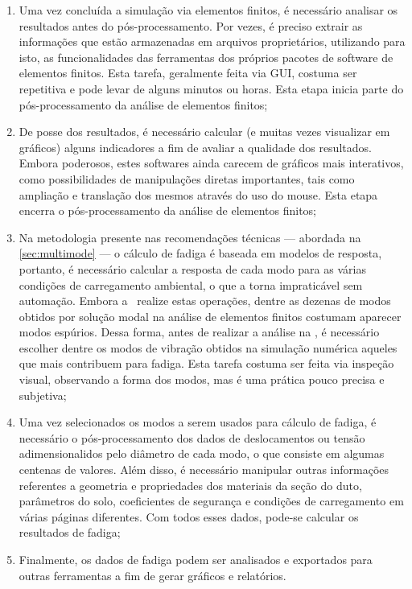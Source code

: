 \begin{enumerate}[label= (\arabic*)]
    \item Uma vez concluída a simulação via elementos finitos, é necessário analisar os resultados antes do pós-processamento. Por vezes, é preciso extrair as informações que estão armazenadas em arquivos proprietários, utilizando para isto, as funcionalidades das ferramentas dos próprios pacotes de software de elementos finitos. Esta tarefa, geralmente feita via GUI, costuma ser repetitiva e pode levar de alguns minutos ou horas. Esta etapa inicia parte do pós-processamento da análise de elementos finitos;
    \item De posse dos resultados, é necessário calcular (e muitas vezes visualizar em gráficos) alguns indicadores a fim de avaliar a qualidade dos resultados. Embora poderosos, estes softwares ainda carecem de gráficos mais interativos, como possibilidades de manipulações diretas importantes, tais como ampliação e translação dos mesmos através do uso do mouse. Esta etapa encerra o pós-processamento da análise de elementos finitos;
    \item Na metodologia presente nas recomendações técnicas --- abordada na \autoref{sec:multimode} --- o cálculo de fadiga é baseada em modelos de resposta, portanto, é necessário calcular a resposta de cada modo para as várias condições de carregamento ambiental, o que a torna impraticável sem automação. Embora a  \fatfree\ realize estas operações, dentre as dezenas de modos obtidos por solução modal na análise de elementos finitos costumam aparecer modos espúrios. Dessa forma, antes de realizar a análise na \fatfree, é necessário escolher dentre os modos de vibração obtidos na simulação numérica aqueles que mais contribuem para fadiga. Esta tarefa costuma ser feita via inspeção visual, observando a forma dos modos, mas é uma prática pouco precisa e subjetiva;
    \item Uma vez selecionados os modos a serem usados para cálculo de fadiga, é necessário o pós-processamento dos dados de deslocamentos ou tensão adimensionalidos pelo diâmetro de cada modo, o que consiste em algumas centenas de valores. Além disso, é necessário manipular outras informações referentes a geometria e propriedades dos materiais da seção do duto, parâmetros do solo, coeficientes de segurança e condições de carregamento em várias páginas diferentes. Com todos esses dados, pode-se calcular os resultados de fadiga;
    \item Finalmente, os dados de fadiga podem ser analisados e exportados para outras ferramentas a fim de gerar gráficos e relatórios.
\end{enumerate}
